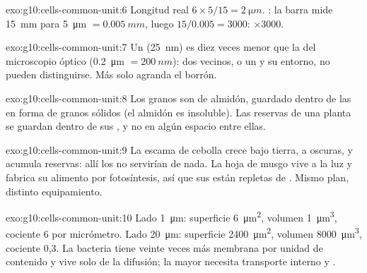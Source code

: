 \begin{solution}{exo:g10:cells-common-unit:6}
Longitud real $6 \times 5/15 = \qty{2}{\micro m}$. : la barra
mide \qty{15}{mm} para \qty{5}{\micro m} $= \qty{0.005}{mm}$, luego
$15/0.005 = 3000$: $\times 3000$.
\end{solution}

\begin{solution}{exo:g10:cells-common-unit:7}
Un  (\qty{25}{nm}) es diez veces menor que la  del
microscopio óptico (\qty{0.2}{\micro m} $= \qty{200}{nm}$): dos
 vecinos, o un  y su entorno, no pueden distinguirse.
Más  solo agranda el borrón.
\end{solution}

\begin{solution}{exo:g10:cells-common-unit:8}
Los granos son de almidón, guardado dentro de las  en forma de
granos sólidos (el almidón es insoluble). Las reservas de una planta se
guardan dentro de sus , y no en algún espacio entre ellas.
\end{solution}

\begin{solution}{exo:g10:cells-common-unit:9}
La escama de cebolla crece bajo tierra, a oscuras, y acumula reservas:
allí los  no servirían de nada. La hoja de musgo vive a la
luz y fabrica su alimento por fotosíntesis, así que sus  están
repletas de . Mismo plan, distinto equipamiento.
\end{solution}

\begin{solution}{exo:g10:cells-common-unit:10}
Lado \qty{1}{\micro m}: superficie \qty{6}{\micro m^2}, volumen
\qty{1}{\micro m^3}, cociente 6 por micrómetro. Lado \qty{20}{\micro m}:
superficie \qty{2400}{\micro m^2}, volumen \qty{8000}{\micro m^3},
cociente 0,3. La bacteria tiene veinte veces más membrana por unidad de
contenido y vive solo de la difusión; la  mayor necesita
transporte interno y .
\end{solution}

